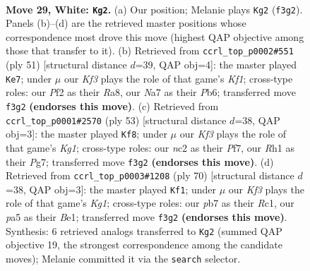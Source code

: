 \documentclass[11pt]{article}
\begin{document}
\clearpage

\begin{figure}[p]\centering
\begin{subfigure}{0.46\textwidth}\centering
\resizebox{\linewidth}{!}{%
\newchessgame
\chessboard[
  setfen={4k1r1/Nppnp2p/6p1/p7/5P1P/2P2K2/P1n2P2/2B4R w - - 3 29},
  showmover=false,
  pgfstyle=straightmove, color=movearrow, markmove={f3-g2}
]}
\caption{}
\end{subfigure}\hfill
\begin{subfigure}{0.46\textwidth}\centering
\resizebox{\linewidth}{!}{%
\newchessgame
\chessboard[
  setfen={r4k2/p4pp1/1p3n1p/1N2p3/1P6/6P1/1P2PP1P/3R2K1 b - - 0 26},
  showmover=false,
  pgfstyle=straightmove, color=movearrow, markmove={f8-e7}
]}
\caption{}
\end{subfigure}
\\[4pt]
\begin{subfigure}{0.46\textwidth}\centering
\resizebox{\linewidth}{!}{%
\newchessgame
\chessboard[
  setfen={6k1/p2b1pp1/3P4/1prN4/2p3p1/8/PPP3PP/3R2K1 b - - 1 27},
  showmover=false,
  pgfstyle=straightmove, color=movearrow, markmove={g8-f8}
]}
\caption{}
\end{subfigure}\hfill
\begin{subfigure}{0.46\textwidth}\centering
\resizebox{\linewidth}{!}{%
\newchessgame
\chessboard[
  setfen={r3k3/4p2p/6p1/p2Pp3/P3n3/1P6/6PP/2R1B1K1 w - - 4 36},
  showmover=false,
  pgfstyle=straightmove, color=movearrow, markmove={g1-f1}
]}
\caption{}
\end{subfigure}
\caption{\textbf{Move 29, White: \texttt{Kg2}.} (a) Our position; Melanie plays \texttt{Kg2} (\texttt{f3g2}). Panels (b)--(d) are the retrieved master positions whose correspondence most drove this move (highest QAP objective among those that transfer to it). (b) Retrieved from \texttt{ccrl\_top\_p0002\#551} (ply 51) [structural distance $d$=39, QAP obj=4]: the master played \texttt{Ke7}; under $\mu$ our \emph{Kf3} plays the role of that game's \emph{Kf1}; cross-type roles: our \emph{P}f2 as their \emph{R}a8, our \emph{N}a7 as their \emph{P}b6; transferred move \texttt{f3g2} \textbf{(endorses this move)}. (c) Retrieved from \texttt{ccrl\_top\_p0001\#2570} (ply 53) [structural distance $d$=38, QAP obj=3]: the master played \texttt{Kf8}; under $\mu$ our \emph{Kf3} plays the role of that game's \emph{Kg1}; cross-type roles: our \emph{n}c2 as their \emph{P}f7, our \emph{R}h1 as their \emph{P}g7; transferred move \texttt{f3g2} \textbf{(endorses this move)}. (d) Retrieved from \texttt{ccrl\_top\_p0003\#1208} (ply 70) [structural distance $d$=38, QAP obj=3]: the master played \texttt{Kf1}; under $\mu$ our \emph{Kf3} plays the role of that game's \emph{Kg1}; cross-type roles: our \emph{p}b7 as their \emph{R}c1, our \emph{p}a5 as their \emph{B}e1; transferred move \texttt{f3g2} \textbf{(endorses this move)}. Synthesis: 6 retrieved analogs transferred to \texttt{Kg2} (summed QAP objective 19, the strongest correspondence among the candidate moves); Melanie committed it via the \texttt{search} selector.}
\label{fig:thought-m56}
\end{figure}
\end{document}
